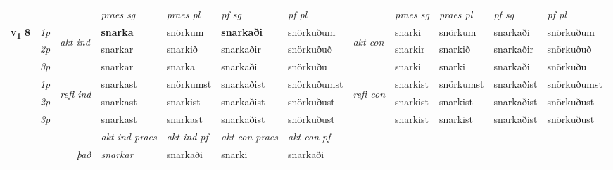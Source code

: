\begin{longtable}[l]{X>{\footnotesize\itshape}llXXXXlXXXX}
\midrule

 & &   & \textit{praes sg}  & \textit{praes pl}    & \textit{ pf sg} & \textit{pf pl} & & \textit{praes sg}  & \textit{praes pl}    & \textit{pf sg} & \textit{pf pl }  \\ \cmidrule{4-7} \cmidrule{9-12}
 \multirow{2}{*}{{{\textbf{v{\textsubscript{1}}} \Large{\textbf{8}}}}}  & 1p & \multirow{3}{*}{\begin{turn}{90}\textit{akt ind}\end{turn}} & \textbf{snarka} & snörkum & \textbf{snarkaði} & snörkuðum & \multirow{3}{*}{\begin{turn}{90}\textit{akt con}\end{turn}} &snarki & snörkum & snarkaði & snörkuðum\\*
 & 2p &  &  snarkar  & snarkið & snarkaðir & snörkuðuð & & snarkir & snarkið & snarkaðir & snörkuðuð \\*
 & 3p &  & snarkar & snarka & snarkaði & snörkuðu & & snarki & snarki& snarkaði & snörkuðu \\*
\cmidrule{4-7} \cmidrule{9-12}
 & 1p & \multirow{3}{*}{\begin{turn}{90}\textit{refl ind}\end{turn}}  & snarkast & snörkumst & snarkaðist & snörkuðumst & \multirow{3}{*}{\begin{turn}{90}\textit{refl con}\end{turn}}  &snarkist & snörkumst & snarkaðist & snörkuðumst \\*
 & 2p &  & snarkast & snarkist & snarkaðist & snörkuðust & &snarkist & snarkist & snarkaðist & snörkuðust \\*
 & 3p  & & snarkast & snarkast & snarkaðist & snörkuðust & & snarkist & snarkist& snarkaðist & snörkuðust \\*
\cmidrule{4-7} \cmidrule{9-12}

   && &  \textit{akt ind praes} & \textit{akt ind pf} & \textit{akt con praes} & \textit{akt con pf} \\*
\multicolumn{3}{r}{\textit{það}} & snarkar & snarkaði & snarki & snarkaði \\*


\end{longtable}
